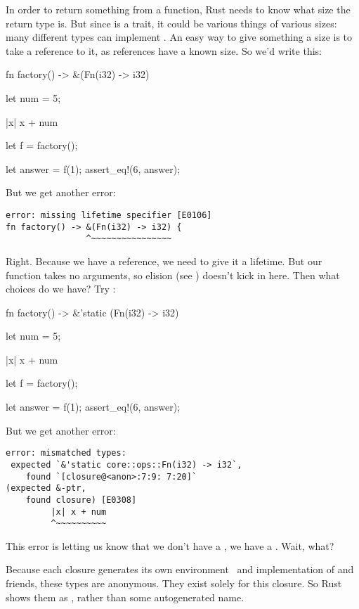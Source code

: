 In order to return something from a function, Rust needs to know what size the return type is. But since  is a trait, it 
could be various things of various sizes: many different types can implement . An easy way to give something a size is to 
take a reference to it, as references have a known size. So we'd write this:

\begin{rustc}
fn factory() -> &(Fn(i32) -> i32) {
    let num = 5;

    |x| x + num
}

let f = factory();

let answer = f(1);
assert_eq!(6, answer);
\end{rustc}

But we get another error:

\begin{verbatim}
error: missing lifetime specifier [E0106]
fn factory() -> &(Fn(i32) -> i32) {
                ^~~~~~~~~~~~~~~~~
\end{verbatim}

Right. Because we have a reference, we need to give it a lifetime. But our  function takes no arguments, so 
elision (see ) doesn't kick in here. Then what choices do we have? Try :

\begin{rustc}
fn factory() -> &'static (Fn(i32) -> i32) {
    let num = 5;

    |x| x + num
}

let f = factory();

let answer = f(1);
assert_eq!(6, answer);
\end{rustc}

But we get another error:

\begin{verbatim}
error: mismatched types:
 expected `&'static core::ops::Fn(i32) -> i32`,
    found `[closure@<anon>:7:9: 7:20]`
(expected &-ptr,
    found closure) [E0308]
         |x| x + num
         ^~~~~~~~~~~
\end{verbatim}

This error is letting us know that we don't have a , we have a . Wait, what?

\blank

Because each closure generates its own environment \struct\ and implementation of  and friends, these types are anonymous. 
They exist solely for this closure. So Rust shows them as , rather than some autogenerated name.


